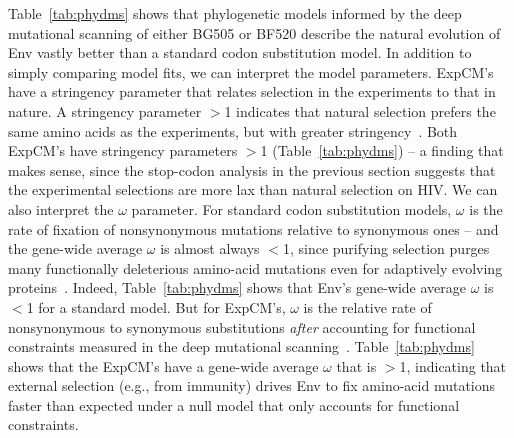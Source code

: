 \documentclass[9pt]{elife}
\begin{document}
Table~\ref{tab:phydms} shows that phylogenetic models informed by the deep mutational scanning of either BG505 or BF520 describe the natural evolution of Env vastly better than a standard codon substitution model.
In addition to simply comparing model fits, we can interpret the model parameters.
ExpCM's have a stringency parameter that relates selection in the experiments to that in nature.
A stringency parameter $>$1 indicates that natural selection prefers the same amino acids as the experiments, but with greater stringency~\citep{hilton2017phydms}.
Both ExpCM's have stringency parameters $>$1 (Table~\ref{tab:phydms}) -- a finding that makes sense, since the stop-codon analysis in the previous section suggests that the experimental selections are more lax than natural selection on HIV.
We can also interpret the $\omega$ parameter.
For standard codon substitution models, $\omega$ is the rate of fixation of nonsynonymous mutations relative to synonymous ones -- and the gene-wide average $\omega$ is almost always $<$1, since purifying selection purges many functionally deleterious amino-acid mutations even for adaptively evolving proteins~\citep{murrell2015gene}.
Indeed, Table~\ref{tab:phydms} shows that Env's gene-wide average $\omega$ is $<$1 for a standard model.
But for ExpCM's, $\omega$ is the relative rate of nonsynonymous to synonymous substitutions \emph{after} accounting for functional constraints measured in the deep mutational scanning~\citep{bloom2017identification}.
Table~\ref{tab:phydms} shows that the ExpCM's have a gene-wide average $\omega$ that is $>$1, indicating that external selection (e.g., from immunity) drives Env to fix amino-acid mutations faster than expected under a null model that only accounts for functional constraints.
\end{document}
